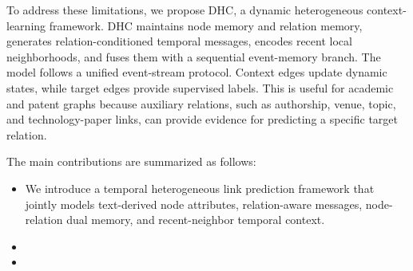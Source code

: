 To address these limitations, we propose DHC, a dynamic heterogeneous context-learning framework. 
DHC maintains node memory and relation memory, generates relation-conditioned temporal messages, 
encodes recent local neighborhoods, and fuses them with a sequential event-memory branch. 
The model follows a unified event-stream protocol. Context edges update dynamic states, while target edges provide supervised labels. 
This is useful for academic and patent graphs because auxiliary relations, such as authorship, venue, topic, and technology-paper links, can provide evidence for predicting a
specific target relation. 

The main contributions are summarized as follows:
\begin{itemize}[leftmargin=*]
\item We introduce a temporal heterogeneous link prediction framework that jointly models text-derived node attributes, relation-aware messages, node-relation dual memory, and recent-neighbor temporal context.
\item {}
\item {}
\end{itemize}
